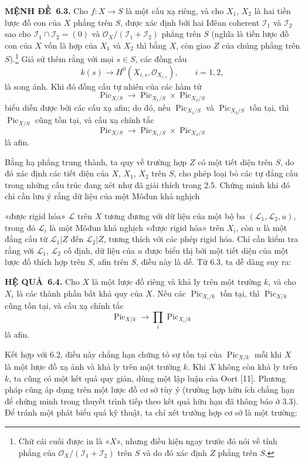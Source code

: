 \documentclass[11pt,twoside,openany]{book}
\numberwithin{equation}{section}
\newcommand{\src}[1]{%
  \phantomsection\hypertarget{src:\fgasourceid:#1}{}%
  \marginpar{\raggedleft\footnotesize\sffamily #1}%
}
\newcommand{\fgasourceid}{unset}
\newcommand{\result}[2]{\par\medskip\noindent\textbf{#1\if\relax\detokenize{#2}\relax\else\ #2\fi.}\quad}
\begin{document}
\result{MỆNH ĐỀ}{6.3} Cho $f:X\longrightarrow S$ là một cấu xạ riêng, và cho
$X_1$, $X_2$ là hai tiền lược đồ con của $X$ phẳng trên $S$, được xác định bởi
hai Iđêan coherent $\mathcal I_1$ và $\mathcal I_2$ sao cho
$\mathcal I_1\cap\mathcal I_2=(0)$ và
$\mathcal O_X/(\mathcal I_1+\mathcal I_2)$ phẳng trên $S$ (nghĩa là tiền lược
đồ con của $X$ vốn là hợp của $X_1$ và $X_2$ thì bằng $X$, còn giao $Z$ của chúng
phẳng trên $S$).\footnote{Chữ cái cuối được in là «$X$», nhưng điều kiện ngay
trước đó nói về tính phẳng của $\mathcal O_X/(\mathcal I_1+\mathcal I_2)$ trên
$S$ và do đó xác định $Z$ phẳng trên $S$.} Giả sử thêm rằng với mọi $s\in S$,
các đồng cấu
\[
k(s)\longrightarrow H^0(X_{i,s},\mathcal O_{X_{i,s}}),\qquad i=1,2,
\]
là song ánh. Khi đó đồng cấu tự nhiên của các hàm tử
\[
\operatorname{Pic}_{X/S}\longrightarrow
\operatorname{Pic}_{X_1/S}\times\operatorname{Pic}_{X_2/S}
\]
biểu diễn được bởi các cấu xạ afin; do đó, nếu
$\operatorname{Pic}_{X_1/S}$ và $\operatorname{Pic}_{X_2/S}$ tồn tại, thì
$\operatorname{Pic}_{X/S}$ cũng tồn tại, và cấu xạ chính tắc
\[
\operatorname{Pic}_{X/S}\longrightarrow
\operatorname{Pic}_{X_1/S}\times\operatorname{Pic}_{X_2/S}
\]
là afin.

Bằng hạ phẳng trung thành, ta quy về trường hợp $Z$ có một tiết diện trên $S$,
do đó xác định các tiết diện của $X$, $X_1$, $X_2$ trên $S$, cho phép loại bỏ
các tự đẳng cấu trong những cấu trúc đang xét như đã giải thích trong 2.5.
Chứng minh khi đó chỉ cần lưu ý rằng dữ liệu của một Môđun khả nghịch
\src{159}
«được rigid hóa» $\mathcal L$ trên $X$ tương đương với dữ liệu của một bộ ba
$(\mathcal L_1,\mathcal L_2,u)$, trong đó $\mathcal L_i$ là một Môđun khả
nghịch «được rigid hóa» trên $X_i$, còn $u$ là một đẳng cấu từ
$\mathcal L_1|Z$ đến $\mathcal L_2|Z$, tương thích với các phép rigid hóa. Chỉ
cần kiểm tra rằng với $\mathcal L_1$, $\mathcal L_2$ cố định, dữ liệu của $u$
được biểu thị bởi một tiết diện của một lược đồ thích hợp trên $S$, afin trên
$S$, điều này là dễ. Từ 6.3, ta dễ dàng suy ra:

\result{HỆ QUẢ}{6.4} Cho $X$ là một lược đồ riêng và khả ly trên một trường
$k$, và cho $X_i$ là các thành phần bất khả quy của $X$. Nếu các
$\operatorname{Pic}_{X_i/k}$ tồn tại, thì $\operatorname{Pic}_{X/k}$ cũng tồn
tại, và cấu xạ chính tắc
\[
\operatorname{Pic}_{X/k}\longrightarrow\prod_i\operatorname{Pic}_{X_i/k}
\]
là afin.

Kết hợp với 6.2, điều này chẳng hạn chứng tỏ sự tồn tại của
$\operatorname{Pic}_{X/k}$ mỗi khi $X$ là một lược đồ xạ ảnh và khả ly trên
một trường $k$. Khi $X$ không còn khả ly trên $k$, ta cũng có một kết quả quy
giản, dùng một lập luận của Oort [11]. Phương pháp cũng áp dụng trên một lược đồ
cơ sở tùy ý (trường hợp hữu ích chẳng hạn để chứng minh trong thuyết trình tiếp
theo kết quả hữu hạn đã thông báo ở 3.3). Để tránh một phát biểu quá kỹ thuật,
ta chỉ xét trường hợp cơ sở là một trường:
\end{document}
